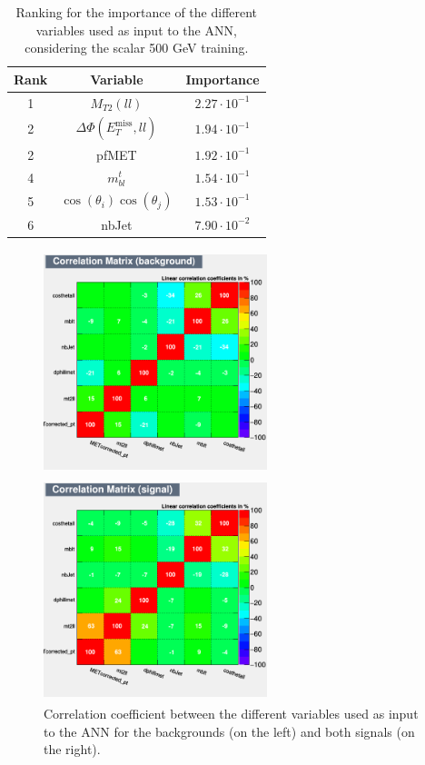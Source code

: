 \documentclass[a4paper, 10pt, openright]{report}
\begin{document}
\begin{table}
\begin{center}
\begin{tabular}{ c|c|c } 
\hline
 Rank & Variable & Importance \\
 \hline
 1 & $M_{T2}(ll)$ & $2.27 \cdot 10^{-1}$ \\
 2 & $\Delta \Phi(E_{T}^{\text{miss}}, ll)$ & $1.94 \cdot 10^{-1}$ \\ 
 2 & pf\ac{MET} & $1.92 \cdot 10^{-1}$ \\
 4 & $m_{bl}^t$ & $1.54 \cdot 10^{-1}$ \\
 5 & $\cos(\theta_i) \cos(\theta_j)$ & $1.53 \cdot 10^{-1}$ \\
 6 & nbJet & $7.90 \cdot 10^{-2}$ \\
\hline
\end{tabular}
\caption{Ranking for the importance of the different variables used as input to the \ac{ANN}, considering the scalar 500 GeV training.}
\label{table:importance2}
\end{center}
\end{table}

\begin{figure}[htbp]
\centering
\begin{minipage}[b]{.49\textwidth}
\includegraphics[width=6.5cm, height=6.5cm]{figs/corr_background.png}
\end{minipage}\hfill
\begin{minipage}[b]{.49\textwidth}
\includegraphics[width=6.5cm, height=6.5cm]{figs/corr_signal.png}
\end{minipage} \hfill
\caption{Correlation coefficient between the different variables used as input to the \ac{ANN} for the backgrounds (on the left) and both signals (on the right).}
\label{fig:correlationVar}
\end{figure}
\end{document}
